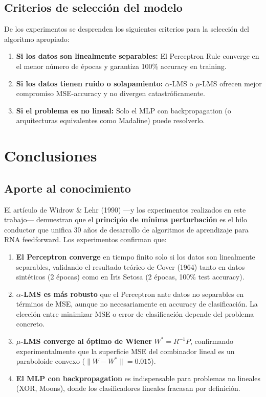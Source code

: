\documentclass[12pt,a4paper]{article}
\newcommand{\norm}[1]{\lVert#1\rVert}
\begin{document}
\subsection{Criterios de selección del modelo}

De los experimentos se desprenden los siguientes criterios para la selección del algoritmo apropiado:

\begin{enumerate}[leftmargin=*]
    \item \textbf{Si los datos son linealmente separables:} El Perceptron Rule converge en el menor número de épocas y garantiza 100\% accuracy en training.
    \item \textbf{Si los datos tienen ruido o solapamiento:} $\alpha$-LMS o $\mu$-LMS ofrecen mejor compromiso MSE-accuracy y no divergen catastróficamente.
    \item \textbf{Si el problema es no lineal:} Solo el MLP con backpropagation (o arquitecturas equivalentes como Madaline) puede resolverlo.
\end{enumerate}

\section{Conclusiones}

\subsection{Aporte al conocimiento}

El artículo de Widrow \& Lehr (1990) —y los experimentos realizados en este trabajo— demuestran que el \textbf{principio de mínima perturbación} es el hilo conductor que unifica 30 años de desarrollo de algoritmos de aprendizaje para RNA feedforward. Los experimentos confirman que:

\begin{enumerate}[leftmargin=*]
    \item \textbf{El Perceptron converge} en tiempo finito solo si los datos son linealmente separables, validando el resultado teórico de Cover (1964) tanto en datos sintéticos (2 épocas) como en Iris Setosa (2 épocas, 100\% test accuracy).
    \item \textbf{$\alpha$-LMS es más robusto} que el Perceptron ante datos no separables en términos de MSE, aunque no necesariamente en accuracy de clasificación. La elección entre minimizar MSE o error de clasificación depende del problema concreto.
    \item \textbf{$\mu$-LMS converge al óptimo de Wiener} $W^* = R^{-1}P$, confirmando experimentalmente que la superficie MSE del combinador lineal es un paraboloide convexo ($\norm{W - W^*} = 0.015$).
    \item \textbf{El MLP con backpropagation} es indispensable para problemas no lineales (XOR, Moons), donde los clasificadores lineales fracasan por definición.
\end{enumerate}
\end{document}
